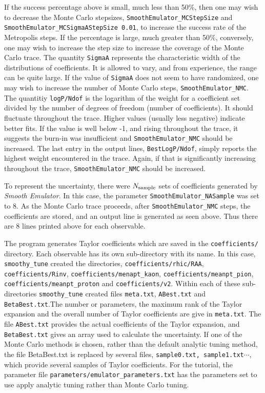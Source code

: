 \documentclass[UserManual.tex]{subfiles}
\begin{document}
If the success percentage above is small, much less than 50\%, then one may wish to decrease the Monte Carlo stepsizes, {\tt SmoothEmulator\_MCStepSize} and {\tt SmoothEmulator\_MCSigmaAStepSize 0.01}, to increase the success rate of the Metropolis steps. If the percentage is large, much greater than 50\%, conversely, one may wish to increase the step size to increase the coverage of the Monte Carlo trace. The quantity {\tt SigmaA} represents the characteristic width of the distributions of coefficients. It is allowed to vary, and from experience, the range can be quite large. If the value of {\tt SigmaA} does not seem to have randomized, one may wish to increase the number of Monte Carlo steps, {\tt  SmoothEmulator\_NMC}. The quantitiy {\tt logP/Ndof} is the logarithm of the weight for a coefficient set divided by the number of degrees of freedom (number of coefficients). It should fluctuate throughout the trace. Higher values (usually less negative) indicate better fits. If the value is well below -1, and rising throughout the trace, it suggests the burn-in was insufficient and {\tt  SmoothEmulator\_NMC} should be increased. The last entry in the output lines, {\tt BestLogP/Ndof}, simply reports the highest weight encountered in the trace. Again, if that is significantly increasing throughout the trace, {\tt  SmoothEmulator\_NMC} should be increased. 

To represent the uncertainty, there were $N_{\rm sample}$ sets of coefficients generated by {\it Smooth Emulator}. In this case, the parameter {\tt SmoothEmulator\_NASample} was set to 8. As the Monte Carlo trace proceeds, after {\tt SmoothEmulator\_NMC} steps, the coefficients are stored, and an output line is generated as seen above. Thus there are 8 lines printed above for each observable.

The program generates Taylor coefficients which are saved in the {\tt coefficients/} directory. Each observable has its own sub-directory with its name. In this case, {\tt smoothy\_tune} created the directories, {\tt coefficients/rhic/RAA}, {\tt coefficients/Rinv}, {\tt coefficients/menapt\_kaon}, {\tt coefficients/meanpt\_pion}, {\tt coefficients/meanpt\_proton} and {\tt coefficients/v2}. Within each of these sub-directories {\tt smoothy\_tune} created files {\tt meta.txt}, {\tt ABest.txt} and {\tt BetaBest.txt}.The number or parameters, the maximum rank of the Taylor expansion and the overall number of Taylor coefficients are give in {\tt meta.txt}. The file {\tt ABest.txt} provides the actual coefficients of the Taylor expansion, and {\tt BetaBest.txt} gives an array used to calculate the uncertainty. If one of the Monte Carlo methods is chosen, rather than the default analytic tuning method, the file {BetaBest.txt} is replaced by several files, {\tt sample0.txt, sample1.txt}$\cdots$, which provide several samples of Taylor coefficients. For the tutorial, the parameter file {\tt parameters/emulator\_parameters.txt} has the parameters set to use apply analytic tuning rather than Monte Carlo tuning.
\end{document}
